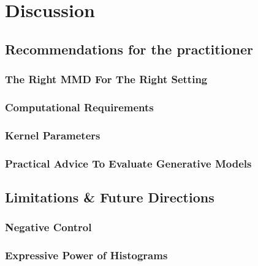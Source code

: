 \chapter{Discussion}



\section{Recommendations for the practitioner}\label{sec:discussion_recommendations}

\subsection{The Right MMD For The Right Setting}

\subsection{Computational Requirements}

\subsection{Kernel Parameters}

\subsection{Practical Advice To Evaluate Generative Models}

\section{Limitations \& Future Directions}

\subsection{Negative Control}

\subsection{Expressive Power of Histograms}

